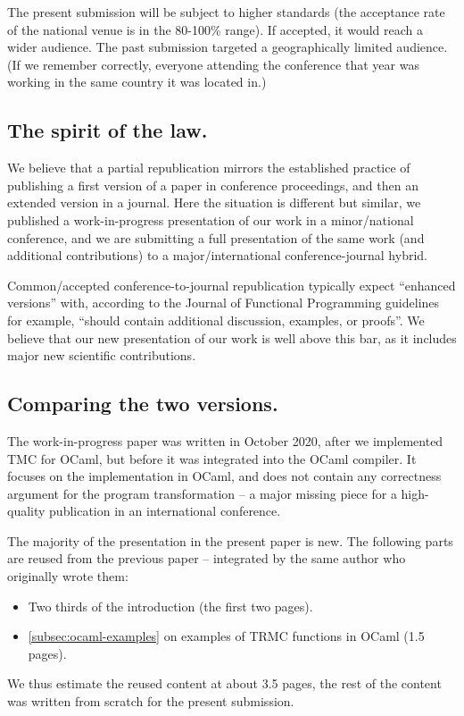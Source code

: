 The present submission will be subject to higher standards
(the acceptance rate of the national venue is in the
80-100\% range). If accepted, it would reach a wider audience. The
past submission targeted a geographically limited audience. (If we
remember correctly, everyone attending the conference that year was
working in the same country it was located in.)

\subsection{The spirit of the law.}

We believe that a partial republication mirrors the established
practice of publishing a first version of a paper in conference
proceedings, and then an extended version in a journal. Here the
situation is different but similar, we published a work-in-progress
presentation of our work in a minor/national conference, and we are
submitting a full presentation of the same work
(and additional contributions) to a major/international
conference-journal hybrid.

Common/accepted conference-to-journal republication typically expect
``enhanced versions'' with, according to the Journal of Functional
Programming guidelines for example, ``should contain additional
discussion, examples, or proofs''. We believe that our new
presentation of our work is well above this bar, as it includes major
new scientific contributions.

\subsection{Comparing the two versions.}

The work-in-progress paper was written in October 2020, after we
implemented TMC for OCaml, but before it was integrated into the OCaml
compiler. It focuses on the implementation in OCaml, and does not
contain any correctness argument for the program transformation --
a major missing piece for a high-quality publication in an
international conference.

The majority of the presentation in the present paper is new. The
following parts are reused from the previous paper --
integrated by the same author who originally wrote them:
\begin{itemize}
\item Two thirds of the introduction (the first two pages).
\item \cref{subsec:ocaml-examples} on examples of TRMC functions in
  OCaml (1.5 pages).
\end{itemize}
We thus estimate the reused content at about 3.5 pages, the rest of
the content was written from scratch for the present submission.

